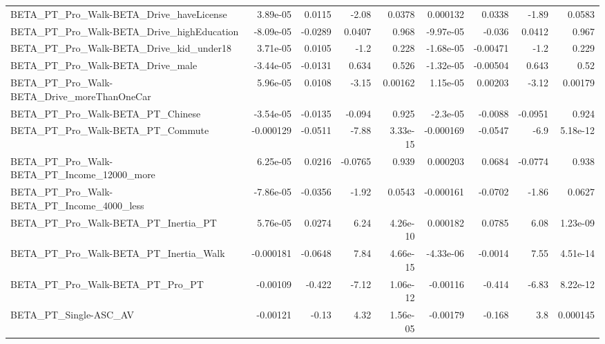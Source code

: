 \begin{tabular}{lrrrrrrrr}
BETA\_PT\_Pro\_Walk-BETA\_Drive\_haveLicense            &    3.89e-05 &       0.0115 &    -2.08 &   0.0378 &   0.000132 &      0.0338 &        -1.89 &        0.0583 \\
BETA\_PT\_Pro\_Walk-BETA\_Drive\_highEducation          &   -8.09e-05 &      -0.0289 &   0.0407 &    0.968 &  -9.97e-05 &      -0.036 &       0.0412 &         0.967 \\
BETA\_PT\_Pro\_Walk-BETA\_Drive\_kid\_under18            &    3.71e-05 &       0.0105 &     -1.2 &    0.228 &  -1.68e-05 &    -0.00471 &         -1.2 &         0.229 \\
BETA\_PT\_Pro\_Walk-BETA\_Drive\_male                   &   -3.44e-05 &      -0.0131 &    0.634 &    0.526 &  -1.32e-05 &    -0.00504 &        0.643 &          0.52 \\
BETA\_PT\_Pro\_Walk-BETA\_Drive\_moreThanOneCar         &    5.96e-05 &       0.0108 &    -3.15 &  0.00162 &   1.15e-05 &     0.00203 &        -3.12 &       0.00179 \\
BETA\_PT\_Pro\_Walk-BETA\_PT\_Chinese                   &   -3.54e-05 &      -0.0135 &   -0.094 &    0.925 &   -2.3e-05 &     -0.0088 &      -0.0951 &         0.924 \\
BETA\_PT\_Pro\_Walk-BETA\_PT\_Commute                   &   -0.000129 &      -0.0511 &    -7.88 & 3.33e-15 &  -0.000169 &     -0.0547 &         -6.9 &      5.18e-12 \\
BETA\_PT\_Pro\_Walk-BETA\_PT\_Income\_12000\_more         &    6.25e-05 &       0.0216 &  -0.0765 &    0.939 &   0.000203 &      0.0684 &      -0.0774 &         0.938 \\
BETA\_PT\_Pro\_Walk-BETA\_PT\_Income\_4000\_less          &   -7.86e-05 &      -0.0356 &    -1.92 &   0.0543 &  -0.000161 &     -0.0702 &        -1.86 &        0.0627 \\
BETA\_PT\_Pro\_Walk-BETA\_PT\_Inertia\_PT                &    5.76e-05 &       0.0274 &     6.24 & 4.26e-10 &   0.000182 &      0.0785 &         6.08 &      1.23e-09 \\
BETA\_PT\_Pro\_Walk-BETA\_PT\_Inertia\_Walk              &   -0.000181 &      -0.0648 &     7.84 & 4.66e-15 &  -4.33e-06 &     -0.0014 &         7.55 &      4.51e-14 \\
BETA\_PT\_Pro\_Walk-BETA\_PT\_Pro\_PT                    &    -0.00109 &       -0.422 &    -7.12 & 1.06e-12 &   -0.00116 &      -0.414 &        -6.83 &      8.22e-12 \\
BETA\_PT\_Single-ASC\_AV                              &    -0.00121 &        -0.13 &     4.32 & 1.56e-05 &   -0.00179 &      -0.168 &          3.8 &      0.000145 \\

\end{tabular}
